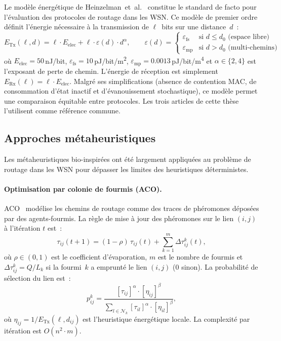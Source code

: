 Le modèle énergétique de Heinzelman~et~al.\ \cite{heinzelman2000leach} constitue le standard de facto pour l'évaluation des protocoles de routage dans les WSN. Ce modèle de premier ordre définit l'énergie nécessaire à la transmission de $\ell$~bits sur une distance~$d$~:
%
\begin{equation}\label{eq:etx}
  E_{\text{Tx}}(\ell, d) = \ell \cdot E_{\text{elec}} + \ell \cdot \varepsilon(d) \cdot d^{\alpha},
  \qquad
  \varepsilon(d) =
  \begin{cases}
    \varepsilon_{\text{fs}} & \text{si } d \leq d_0 \text{ (espace libre)}\\
    \varepsilon_{\text{mp}} & \text{si } d > d_0 \text{ (multi-chemins)}
  \end{cases}
\end{equation}
%
où $E_{\text{elec}} = 50$\,nJ/bit, $\varepsilon_{\text{fs}} = 10$\,pJ/bit/m\textsuperscript{2}, $\varepsilon_{\text{mp}} = 0.0013$\,pJ/bit/m\textsuperscript{4} et $\alpha \in \{2,4\}$ est l'exposant de perte de chemin. L'énergie de réception est simplement $E_{\text{Rx}}(\ell) = \ell \cdot E_{\text{elec}}$. Malgré ses simplifications (absence de contention MAC, de consommation d'état inactif et d'évanouissement stochastique), ce modèle permet une comparaison équitable entre protocoles. Les trois articles de cette thèse l'utilisent comme référence commune.

\subsection{Approches métaheuristiques}


Les métaheuristiques bio-inspirées ont été largement appliquées au problème de routage dans les WSN pour dépasser les limites des heuristiques déterministes.

\paragraph{Optimisation par colonie de fourmis (ACO).}
ACO~\cite{salama2016aco} modélise les chemins de routage comme des traces de phéromones déposées par des agents-fourmis. La règle de mise à jour des phéromones sur le lien $(i,j)$ à l'itération $t$ est~:
\begin{equation}\label{eq:aco-update}
  \tau_{ij}(t+1) = (1-\rho)\,\tau_{ij}(t) + \sum_{k=1}^{m} \Delta\tau_{ij}^k(t),
\end{equation}
où $\rho \in (0,1)$ est le coefficient d'évaporation, $m$ est le nombre de fourmis et $\Delta\tau_{ij}^k = Q / L_k$ si la fourmi~$k$ a emprunté le lien $(i,j)$ (0 sinon). La probabilité de sélection du lien est~:
\begin{equation}\label{eq:aco-prob}
  p_{ij}^k = \frac{[\tau_{ij}]^\alpha \cdot [\eta_{ij}]^\beta}{\sum_{l \in \mathcal{N}_k} [\tau_{il}]^\alpha \cdot [\eta_{il}]^\beta},
\end{equation}
où $\eta_{ij} = 1/E_{\text{Tx}}(\ell, d_{ij})$ est l'heuristique énergétique locale. La complexité par itération est $O(n^2 \cdot m)$.

